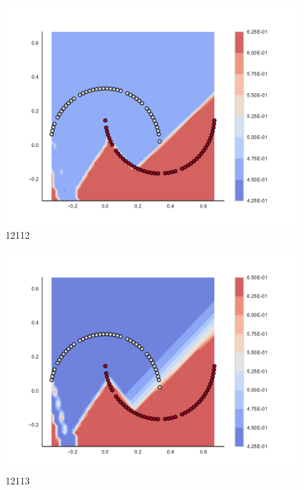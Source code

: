 \begin{subfigure}[b]{0.09\textwidth}
    \includegraphics[clip, trim=2.35cm 1.75cm 4.5cm 0cm,width=\textwidth]{img/convergence/12112.pdf}
    \caption{12112}
    \label{fig:convergence_12112}
\end{subfigure}
%
\begin{subfigure}[b]{0.09\textwidth}
    \includegraphics[clip, trim=2.35cm 1.75cm 4.5cm 0cm,width=\textwidth]{img/convergence/12113.pdf}
    \caption{12113}
    \label{fig:convergence_12113}
\end{subfigure}
%
